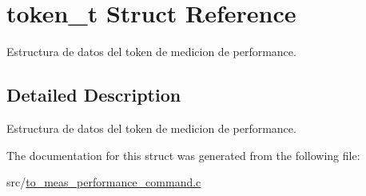 \hypertarget{structtoken__t}{}\section{token\+\_\+t Struct Reference}
\label{structtoken__t}


Estructura de datos del token de medicion de performance.  




\subsection{Detailed Description}
Estructura de datos del token de medicion de performance. 

The documentation for this struct was generated from the following file\+:\begin{DoxyCompactItemize}
\item 
src/\hyperlink{to__meas__performance__command_8c}{to\+\_\+meas\+\_\+performance\+\_\+command.\+c}\end{DoxyCompactItemize}
